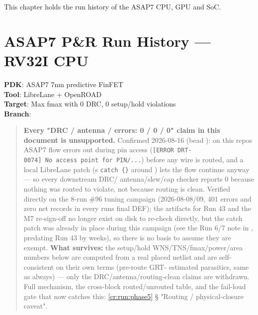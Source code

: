 This chapter holds the run history of the ASAP7 CPU, GPU and SoC.

\section{ASAP7 P\&R Run History --- RV32I CPU}\label{cr:run:asap7}

\begin{record}

\textbf{PDK}: ASAP7 7nm predictive FinFET\\
\textbf{Tool}: LibreLane + OpenROAD\\
\textbf{Target}: Max fmax with 0 DRC, 0 setup/\allowbreak{}hold
violations\\
\textbf{Branch}: 

\begin{quote}
\warn{} \textbf{Every "DRC / antenna / errors: 0 / 0 / 0" claim in this
document is unsupported.} Confirmed 2026-08-16 (bead
):  on this
repo\textquotesingle s ASAP7 flow errors out during pin access
(\texttt{[ERROR\ DRT-\allowbreak{}0074]\ No\ access\ point\ for\ PIN/\allowbreak{}.\allowbreak{}.\allowbreak{}.\allowbreak{}})
before any wire is routed, and a local LibreLane patch
(\textquotesingle s \texttt{catch\ \{\}} around
) lets the flow continue anyway --- so every
downstream DRC/ antenna/\allowbreak{}slew/\allowbreak{}cap checker
reports 0 because nothing was routed to violate, not because routing is
clean. Verified directly on the 8-run \#96  tuning
campaign (2026-08-08/\allowbreak{}09, 401  errors and
zero  net records in every run\textquotesingle s final
DEF); the artifacts for Run 43 and the M7 re-sign-off no longer exist on
disk to re-check directly, but the catch patch was already in place
during this campaign (see the Run 6/7 note in
, predating Run 43 by weeks), so there is no
basis to assume they are exempt. \textbf{What survives:} the
setup/\allowbreak{}hold
WNS/\allowbreak{}TNS/\allowbreak{}fmax/\allowbreak{}power/\allowbreak{}area
numbers below are computed from a real placed netlist and are
self-consistent on their own terms (pre-route GRT- estimated parasitics,
same as always) --- only the
DRC/\allowbreak{}antenna/\allowbreak{}routing-clean claims are
withdrawn. Full mechanism, the cross-block routed/\allowbreak{}unrouted
table, and the fail-loud gate that now catches this:
\cref{cr:run:phase5} § "Routing / physical-closure caveat".
\end{quote}


\end{record}
